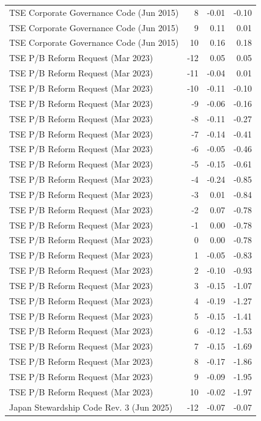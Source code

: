 \begin{table}
\begin{tabular}{lrrr}
TSE Corporate Governance Code (Jun 2015) & 8 & -0.01 & -0.10 \\
TSE Corporate Governance Code (Jun 2015) & 9 & 0.11 & 0.01 \\
TSE Corporate Governance Code (Jun 2015) & 10 & 0.16 & 0.18 \\
TSE P/B Reform Request (Mar 2023) & -12 & 0.05 & 0.05 \\
TSE P/B Reform Request (Mar 2023) & -11 & -0.04 & 0.01 \\
TSE P/B Reform Request (Mar 2023) & -10 & -0.11 & -0.10 \\
TSE P/B Reform Request (Mar 2023) & -9 & -0.06 & -0.16 \\
TSE P/B Reform Request (Mar 2023) & -8 & -0.11 & -0.27 \\
TSE P/B Reform Request (Mar 2023) & -7 & -0.14 & -0.41 \\
TSE P/B Reform Request (Mar 2023) & -6 & -0.05 & -0.46 \\
TSE P/B Reform Request (Mar 2023) & -5 & -0.15 & -0.61 \\
TSE P/B Reform Request (Mar 2023) & -4 & -0.24 & -0.85 \\
TSE P/B Reform Request (Mar 2023) & -3 & 0.01 & -0.84 \\
TSE P/B Reform Request (Mar 2023) & -2 & 0.07 & -0.78 \\
TSE P/B Reform Request (Mar 2023) & -1 & 0.00 & -0.78 \\
TSE P/B Reform Request (Mar 2023) & 0 & 0.00 & -0.78 \\
TSE P/B Reform Request (Mar 2023) & 1 & -0.05 & -0.83 \\
TSE P/B Reform Request (Mar 2023) & 2 & -0.10 & -0.93 \\
TSE P/B Reform Request (Mar 2023) & 3 & -0.15 & -1.07 \\
TSE P/B Reform Request (Mar 2023) & 4 & -0.19 & -1.27 \\
TSE P/B Reform Request (Mar 2023) & 5 & -0.15 & -1.41 \\
TSE P/B Reform Request (Mar 2023) & 6 & -0.12 & -1.53 \\
TSE P/B Reform Request (Mar 2023) & 7 & -0.15 & -1.69 \\
TSE P/B Reform Request (Mar 2023) & 8 & -0.17 & -1.86 \\
TSE P/B Reform Request (Mar 2023) & 9 & -0.09 & -1.95 \\
TSE P/B Reform Request (Mar 2023) & 10 & -0.02 & -1.97 \\
Japan Stewardship Code Rev. 3 (Jun 2025) & -12 & -0.07 & -0.07 \\

\end{tabular}
\end{table}
